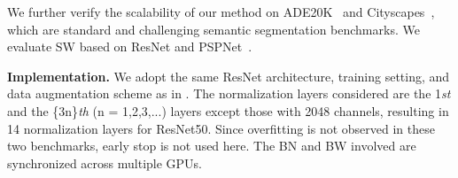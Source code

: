 \documentclass[10pt,twocolumn,letterpaper]{article}
\begin{document}
\setlength{\tabcolsep}{4pt}
\begin{table}[!t]
	\begin{center}
		\caption{Comparison with advanced methods on the ADE20K validation set. * indicates our implementation. }
		\label{ade20k2}
	\end{center}
	\vspace{-15pt}
\end{table}
\setlength{\tabcolsep}{1.4pt}

We further verify the scalability of our method on ADE20K~\cite{zhou2017scene} and Cityscapes~\cite{cordts2016cityscapes}, which are standard and challenging semantic segmentation benchmarks.
We evaluate SW based on ResNet and PSPNet~\cite{zhao2017pyramid}.


\noindent\textbf{Implementation.} 
We adopt the same ResNet architecture, training setting, and data augmentation scheme as in \cite{zhao2017pyramid}.
The normalization layers considered are the 1\textit{st} and the \{3n\}\textit{th} (n = 1,2,3,...) layers except those with 2048 channels, resulting in 14 normalization layers for ResNet50.
Since overfitting is not observed in these two benchmarks, early stop is not used here.
The BN and BW involved are synchronized across multiple GPUs.
\end{document}
